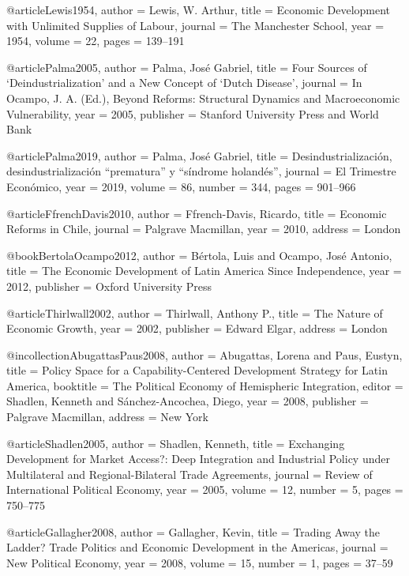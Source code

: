 @article{Lewis1954,
	author  = {Lewis, W. Arthur},
	title   = {Economic Development with Unlimited Supplies of Labour},
	journal = {The Manchester School},
	year    = {1954},
	volume  = {22},
	pages   = {139--191}
}


@article{Palma2005,
	author  = {Palma, Jos{\'e} Gabriel},
	title   = {Four Sources of `Deindustrialization' and a New Concept of `{Dutch Disease}'},
	journal = {In Ocampo, J. A. (Ed.), Beyond Reforms: Structural Dynamics and Macroeconomic Vulnerability},
	year    = {2005},
	publisher = {Stanford University Press and World Bank}
}

@article{Palma2019,
	author  = {Palma, Jos{\'e} Gabriel},
	title   = {Desindustrializaci{\'o}n, desindustrializaci{\'o}n ``prematura'' y ``s{\'i}ndrome holand{\'e}s''},
	journal = {El Trimestre Econ{\'o}mico},
	year    = {2019},
	volume  = {86},
	number  = {344},
	pages   = {901--966}
}

@article{FfrenchDavis2010,
	author  = {Ffrench-Davis, Ricardo},
	title   = {Economic Reforms in {Chile}},
	journal = {Palgrave Macmillan},
	year    = {2010},
	address = {London}
}

@book{BertolaOcampo2012,
	author    = {B{\'e}rtola, Luis and Ocampo, Jos{\'e} Antonio},
	title     = {The Economic Development of {Latin America} Since Independence},
	year      = {2012},
	publisher = {Oxford University Press}
}

@article{Thirlwall2002,
	author    = {Thirlwall, Anthony P.},
	title     = {The Nature of Economic Growth},
	year      = {2002},
	publisher = {Edward Elgar},
	address   = {London}
}

@incollection{AbugattasPaus2008,
	author    = {Abugattas, Lorena and Paus, Eustyn},
	title     = {Policy Space for a Capability-Centered Development Strategy for {Latin America}},
	booktitle = {The Political Economy of Hemispheric Integration},
	editor    = {Shadlen, Kenneth and S{\'a}nchez-Ancochea, Diego},
	year      = {2008},
	publisher = {Palgrave Macmillan},
	address   = {New York}
}

@article{Shadlen2005,
	author  = {Shadlen, Kenneth},
	title   = {Exchanging Development for Market Access?: Deep Integration and Industrial Policy under Multilateral and Regional-Bilateral Trade Agreements},
	journal = {Review of International Political Economy},
	year    = {2005},
	volume  = {12},
	number  = {5},
	pages   = {750--775}
}

@article{Gallagher2008,
	author  = {Gallagher, Kevin},
	title   = {Trading Away the Ladder? Trade Politics and Economic Development in the {Americas}},
	journal = {New Political Economy},
	year    = {2008},
	volume  = {15},
	number  = {1},
	pages   = {37--59}
}

